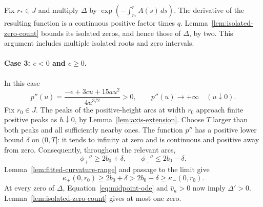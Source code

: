 Fix $r_*\in J$ and multiply $\Delta$ by
$\exp(-\int_{r_*}^r A(s)\,ds)$. The derivative of the resulting
function is a continuous positive factor times $q$.
Lemma~\ref{lem:isolated-zero-count} bounds its isolated zeros,
and hence those of $\Delta$, by two. This argument includes
multiple isolated roots and zero intervals.

\paragraph{Case 3: $e<0$ and $c\ge0$.}
In this case
\begin{equation}\label{eq:second-odd}
 p''(u)=\frac{-e+3cu+15au^2}{4u^{3/2}}>0,
 \qquad p''(u)\longrightarrow+\infty\quad(u\downarrow0).
\end{equation}
Fix $r_0\in J$. The peaks of the positive-height arcs at width
$r_0$ approach finite positive peaks as $h\downarrow0$, by
Lemma~\ref{lem:axis-extension}. Choose $T$ larger than both peaks
and all sufficiently nearby ones. The function $p''$ has a
positive lower bound $\delta$ on $(0,T]$: it tends to infinity
at zero and is continuous and positive away from zero.
Consequently, throughout the relevant arcs,
\[
 \phi_+''\ge2b_0+\delta,\qquad
 \phi_-''\le2b_0-\delta.
\]
Lemma~\ref{lem:fitted-curvature-range} and passage to the limit give
\begin{equation}\label{eq:curvature-gap}
 \kappa_+(0,r_0)\ge2b_0+\delta
 >2b_0-\delta\ge\kappa_-(0,r_0).
\end{equation}
At every zero of $\Delta$, Equation~\eqref{eq:midpoint-ode}
and $\widehat v_\kappa>0$ now imply $\Delta'>0$.
Lemma~\ref{lem:isolated-zero-count} gives at most one zero.

